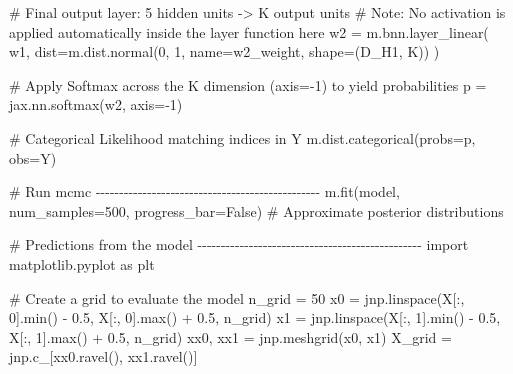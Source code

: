 \documentclass[
  letterpaper,
  DIV=11,
  numbers=noendperiod]{scrartcl}
\newenvironment{Shaded}{\begin{snugshade}}{\end{snugshade}}
\newcommand{\BuiltInTok}[1]{\textcolor[rgb]{0.00,0.23,0.31}{#1}}
\newcommand{\CommentTok}[1]{\textcolor[rgb]{0.37,0.37,0.37}{#1}}
\newcommand{\DecValTok}[1]{\textcolor[rgb]{0.68,0.00,0.00}{#1}}
\newcommand{\FloatTok}[1]{\textcolor[rgb]{0.68,0.00,0.00}{#1}}
\newcommand{\ImportTok}[1]{\textcolor[rgb]{0.00,0.46,0.62}{#1}}
\newcommand{\NormalTok}[1]{\textcolor[rgb]{0.00,0.23,0.31}{#1}}
\newcommand{\OperatorTok}[1]{\textcolor[rgb]{0.37,0.37,0.37}{#1}}
\newcommand{\StringTok}[1]{\textcolor[rgb]{0.13,0.47,0.30}{#1}}
\newcommand{\VariableTok}[1]{\textcolor[rgb]{0.07,0.07,0.07}{#1}}
\begin{document}
\begin{Shaded}
\begin{Highlighting}[]
    \CommentTok{\# Final output layer: 5 hidden units {-}\textgreater{} K output units}
    \CommentTok{\# Note: No activation is applied automatically inside the layer function here}
\NormalTok{    w2 }\OperatorTok{=}\NormalTok{ m.bnn.layer\_linear(}
\NormalTok{        w1,}
\NormalTok{        dist}\OperatorTok{=}\NormalTok{m.dist.normal(}\DecValTok{0}\NormalTok{, }\DecValTok{1}\NormalTok{, name}\OperatorTok{=}\StringTok{\textquotesingle{}w2\_weight\textquotesingle{}}\NormalTok{, shape}\OperatorTok{=}\NormalTok{(D\_H1, K))}
\NormalTok{    )}
    
    \CommentTok{\# Apply Softmax across the K dimension (axis={-}1) to yield probabilities}
\NormalTok{    p }\OperatorTok{=}\NormalTok{ jax.nn.softmax(w2, axis}\OperatorTok{={-}}\DecValTok{1}\NormalTok{)}
    
    \CommentTok{\# Categorical Likelihood matching indices in Y}
\NormalTok{    m.dist.categorical(probs}\OperatorTok{=}\NormalTok{p, obs}\OperatorTok{=}\NormalTok{Y)}

\CommentTok{\# Run mcmc {-}{-}{-}{-}{-}{-}{-}{-}{-}{-}{-}{-}{-}{-}{-}{-}{-}{-}{-}{-}{-}{-}{-}{-}{-}{-}{-}{-}{-}{-}{-}{-}{-}{-}{-}{-}{-}{-}{-}{-}{-}{-}{-}{-}{-}{-}{-}{-}}
\NormalTok{m.fit(model, num\_samples}\OperatorTok{=}\DecValTok{500}\NormalTok{, progress\_bar}\OperatorTok{=}\VariableTok{False}\NormalTok{) }\CommentTok{\# Approximate posterior distributions}

\CommentTok{\# Predictions from the model {-}{-}{-}{-}{-}{-}{-}{-}{-}{-}{-}{-}{-}{-}{-}{-}{-}{-}{-}{-}{-}{-}{-}{-}{-}{-}{-}{-}{-}{-}{-}{-}{-}{-}{-}{-}{-}{-}{-}{-}{-}{-}{-}{-}{-}{-}{-}{-}}
\ImportTok{import}\NormalTok{ matplotlib.pyplot }\ImportTok{as}\NormalTok{ plt}

\CommentTok{\# Create a grid to evaluate the model}
\NormalTok{n\_grid }\OperatorTok{=} \DecValTok{50}
\NormalTok{x0 }\OperatorTok{=}\NormalTok{ jnp.linspace(X[:, }\DecValTok{0}\NormalTok{].}\BuiltInTok{min}\NormalTok{() }\OperatorTok{{-}} \FloatTok{0.5}\NormalTok{, X[:, }\DecValTok{0}\NormalTok{].}\BuiltInTok{max}\NormalTok{() }\OperatorTok{+} \FloatTok{0.5}\NormalTok{, n\_grid)}
\NormalTok{x1 }\OperatorTok{=}\NormalTok{ jnp.linspace(X[:, }\DecValTok{1}\NormalTok{].}\BuiltInTok{min}\NormalTok{() }\OperatorTok{{-}} \FloatTok{0.5}\NormalTok{, X[:, }\DecValTok{1}\NormalTok{].}\BuiltInTok{max}\NormalTok{() }\OperatorTok{+} \FloatTok{0.5}\NormalTok{, n\_grid)}
\NormalTok{xx0, xx1 }\OperatorTok{=}\NormalTok{ jnp.meshgrid(x0, x1)}
\NormalTok{X\_grid }\OperatorTok{=}\NormalTok{ jnp.c\_[xx0.ravel(), xx1.ravel()]}


\end{Highlighting}
\end{Shaded}
\end{document}
